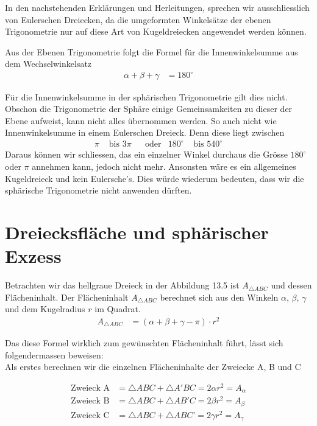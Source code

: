\begin{refsection}
In den nachstehenden Erklärungen und Herleitungen, sprechen wir ausschliesslich von Eulerschen Dreiecken, da die umgeformten Winkelsätze der ebenen Trigonometrie nur auf diese Art von Kugeldreiecken angewendet werden können.

Aus der Ebenen Trigonometrie folgt die Formel für die Innenwinkelsumme aus dem Wechselwinkelsatz
\begin{align*}
\alpha + \beta + \gamma &= 180^{\circ}
\end{align*}

Für die Innenwinkelsumme in der sphärischen Trigonometrie gilt dies nicht. Obschon die Trigonometrie der Sphäre einige Gemeinsamkeiten zu dieser der Ebene aufweist, kann nicht alles übernommen werden.
So auch nicht wie Innenwinkelsumme in einem Eulerschen Dreieck.
Denn diese liegt zwischen
\[
\begin{aligned}
\pi
&\text{ bis }
3\pi
&
&\text{oder}
&
180^{\circ}
&\text{ bis }
540^{\circ}
\end{aligned}
\]
Daraus können wir schliessen, das ein einzelner Winkel durchaus die Grösse $180^{\circ}$ oder $\pi$ annehmen kann, jedoch nicht mehr. Ansonsten wäre es ein allgemeines Kugeldreieck und kein Eulersche’s. Dies würde wiederum bedeuten, dass wir die sphärische Trigonometrie nicht anwenden dürften.



\section{Dreiecksfläche und sphärischer Exzess} \label{Flaeche} 
Betrachten wir das hellgraue Dreieck in der Abbildung 13.5 ist $A_{ \triangle{ ABC }}$ und dessen Flächeninhalt. Der Flächeninhalt $A_{ \triangle{ ABC }}$ berechnet sich aus den Winkeln $\alpha$, $\beta$, $\gamma$ und dem Kugelradius $r$ im Quadrat.
\begin{align*}
A_{ \triangle{ ABC }} &= (\alpha + \beta + \gamma - \pi) \cdot r^2
\end{align*}

Das diese Formel wirklich zum gewünschten Flächeninhalt führt, lässt sich folgendermassen beweisen:\\

Als erstes berechnen wir die einzelnen Flächeninhalte der Zweiecke A, B und C

\begin{align*}
\text{Zweieck A}
&=
\triangle{ABC} + \triangle{A'BC} = 2 \alpha r^{ 2 } = A_{ \alpha }\\
\text{Zweieck B}
&=
\triangle{ABC} + \triangle{AB'C} = 2 \beta r^{ 2 } = A_{ \beta }\\
\text{Zweieck C}
&=
\triangle{ABC} + \triangle{ABC’} = 2 \gamma r^{ 2 } = A_{ \gamma }
\end{align*}


\end{refsection}
